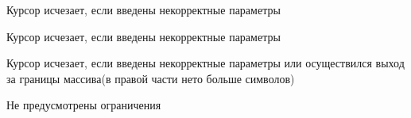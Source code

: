 
\begin{DoxyRefList}
\item[\label{bug__bug000001}%
\Hypertarget{bug__bug000001}%
Файл \mbox{\hyperlink{load_8c}{load.c}} ]Курсор исчезает, если введены некорректные параметры  
\item[\label{bug__bug000002}%
\Hypertarget{bug__bug000002}%
Файл \mbox{\hyperlink{m_8c}{m.c}} ]Курсор исчезает, если введены некорректные параметры  
\item[\label{bug__bug000003}%
\Hypertarget{bug__bug000003}%
Файл \mbox{\hyperlink{mcf_8c}{mcf.c}} ]Курсор исчезает, если введены некорректные параметры или осуществился выход за границы массива(в правой части нето больше символов)  
\item[\label{bug__bug000004}%
\Hypertarget{bug__bug000004}%
page \mbox{\hyperlink{index}{Прототип работы текстового редактора}} ]Не предусмотрены ограничения 
\end{DoxyRefList}